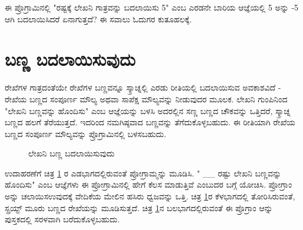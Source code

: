ಈ ಪ್ರೊಗ್ರಾಮಿನಲ್ಲಿ "ರಷ್ಟಕ್ಕೆ ಲೇಖನಿ ಗಾತ್ರವನ್ನು ಬದಲಾಯಿಸು 5" ಎಂಬ ಎರಡನೇ ಬಾರಿಯ  ಆಜ್ಞೆಯಲ್ಲಿ 5 ಅನ್ನು -5 ಆಗಿ ಬದಲಾಯಿಸಿದರೆ ಏನಾಗುತ್ತದೆ? ಈ ಸವಾಲು ಓದುಗರ ಕುತೂಹಲಕ್ಕೆ. 

\section{ಬಣ್ಣ ಬದಲಾಯಿಸುವುದು}
ರೇಖೆಗಳ ಗಾತ್ರದಂತೆಯೇ ರೇಖೆಗಳ ಬಣ್ಣವನ್ನೂ ಸ್ಕ್ರಾಚ್ನಲ್ಲಿ ಎರಡು ರೀತಿಯಲ್ಲಿ  ಬದಲಾಯಿಸುವ ಅವಕಾಶವಿದೆ - ರೇಖೆಯ ಬಣ್ಣದ ಸಂಪೂರ್ಣ ಮೌಲ್ಯ ಅಥವಾ ಸಾಪೆಕ್ಷ ಮೌಲ್ಯವನ್ನು ನೀಡುವುದರ ಮೂಲಕ.  ಲೇಖನಿ ಗುಂಪಿನಿಂದ "ಲೇಖನಿ ಬಣ್ಣವನ್ನು ಹೊಂದಿಸು" ಎಂಬ ಆಜ್ಞೆಯನ್ನು ಬಳಸಿ ಅದರಲ್ಲಿನ ಸಣ್ಣ ಬಣ್ಣದ ಚೌಕವನ್ನು ಒತ್ತಿದರೆ, ಸ್ಕ್ರಾಚ್ನ ಬಣ್ಣದ ಹಲಗೆ ತೆರೆಯುತ್ತದೆ. ಇದರಿಂದ ನಮಗಿಷ್ಠವಾದ ಬಣ್ಣವನ್ನು ತೆಗೆದುಕೊಳ್ಳಬಹುದು.  ಈ ರೀತಿಯಾಗಿ ರೇಖೆಯ ಬಣ್ಣದ ಸಂಪೂರ್ಣ ಮೌಲ್ಯವನ್ನು ಪ್ರೊಗ್ರಾಮಿನಲ್ಲಿ ಬಳಸಬಹುದು.

\begin{figure}[h]
\begin{center}
\begin{multicols}{2}
\begin{Scratch}[1]
\beginbox{}
\end{Scratch}


\end{multicols}
\vspace{1cm}
\end{center}
\caption{ಲೇಖನಿ ಬಣ್ಣ ಬದಲಾಯಿಸುವುದು}
\label{pen_color}
\end{figure}
ಉದಾಹರಣೆಗೆ ಚಿತ್ರ \ref{pen_color} ರ ಎಡಭಾಗದಲ್ಲಿರುವಂತೆ ಪ್ರೋಗ್ರಾಮ್ಮನ್ನು ಮೂಡಿಸಿ.  " \_\_ ರಷ್ಟು ಲೇಖನಿ ಬಣ್ಣವನ್ನು ಹೊಂದಿಸು" ಎಂಬ  ಆಜ್ಞೆಗಳು ಈ ಪ್ರೋಗ್ರಾಮಿನಲ್ಲಿ ಹೇಗೆ ಕೆಲಸ ಮಾಡುತ್ತಿವೆ ಎಂಬುದರ ಬಗ್ಗೆ ಯೋಚಿಸಿ.  ಪ್ರೋಗ್ರಾಂ ಅನ್ನು  ಚಲಾಯಿಸಉವುದಕ್ಕೆ ವೇದಿಕೆಯ ಮೇಲಿನ ಹಸಿರು ಧ್ವಜವನ್ನು ಒತ್ತಿ.  ಚಿತ್ರ \ref{pen_color}ರ ಕೆಳಭಾಗದಲ್ಲಿ ತೋರಿಸಿರುವಂತೆ, ಸ್ಪ್ರಯ್ಟ್ ಮೂರು ಬಣ್ಣದ ರೇಖೆಯನ್ನು ಮೂಡಿಸುತ್ತದೆ.  ಚಿತ್ರ \ref{pen_color}ನ ಬಲಭಾಗದಲ್ಲಿರುವಂತೆ  ಈ ಪ್ರೊಗ್ರಾಂ ಆನ್ನು ಪುಸ್ತಕದಲ್ಲಿ  ಸರಳವಾಗಿ ಬರೆದುಕೊಳ್ಳಬಹುದು.  

